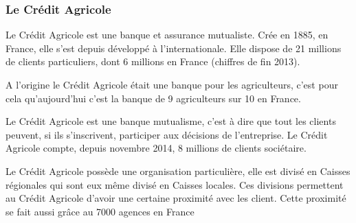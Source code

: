 \documentclass[12pt,a4paper]{article}
\begin{document}
\subsubsection{Le Crédit Agricole}
Le Crédit Agricole est une banque et assurance mutualiste. Crée en 1885, en France, elle s'est depuis développé à l'internationale. Elle dispose de 21 millions de clients particuliers, dont 6 millions en France (chiffres de fin 2013).\par
A l'origine le Crédit Agricole était une banque pour les agriculteurs, c'est pour cela qu'aujourd'hui c'est la banque de 9 agriculteurs sur 10 en France.\par
Le Crédit Agricole est une banque mutualisme, c'est à dire que tout les clients peuvent, si ils s'inscrivent, participer aux décisions de l'entreprise. Le Crédit Agricole compte, depuis novembre 2014, 8 millions de clients sociétaire.\par 
Le Crédit Agricole possède une organisation particulière, elle est divisé en Caisses régionales qui sont eux même divisé en Caisses locales. Ces divisions permettent au Crédit Agricole d'avoir une certaine proximité avec les client. Cette proximité se fait aussi grâce au 7000 agences en France\par 
\end{document}
